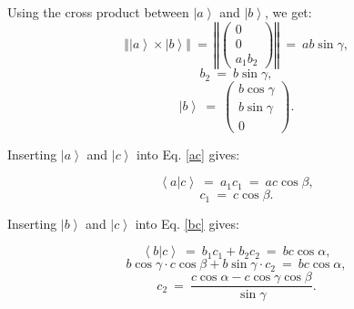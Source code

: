 Using the cross product between $\left| a \right>$ and $\left| b \right>$, we get:
\begin{equation} 
	\left\Vert \left| a \right> \times \left| b \right> \right\Vert \ =\ 
	\left\Vert \left( \begin{array}{c} 0 \\ 0 \\ a_1 b_2 \end{array} \right) \right\Vert \ =\ 
	ab \sin \gamma, \label{crossab}
\end{equation}
\begin{equation} b_2 \ =\  b \sin \gamma, \end{equation}
\begin{equation} 
\boxed{ \left| b \right> \ =\  \left( \begin{array}{c} b \cos \gamma \\ b \sin \gamma \\ 0 \end{array} \right). } 
\label{bvec} 
\end{equation}


Inserting $\left| a \right>$ and $\left| c \right>$ into Eq. \ref{ac} gives:

\begin{equation} \left< a | c \right > \ =\  a_1 c_1 \ =\  ac \cos \beta, \end{equation}
\begin{equation} c_1 \ =\  c \cos \beta. \end{equation}



Inserting $\left| b \right>$ and $\left| c \right>$ into Eq. \ref{bc} gives:

\begin{equation} \left< b | c \right > \ =\  b_1 c_1 + b_2 c_2 \ =\  bc \cos \alpha, \end{equation}
\begin{equation} b \cos \gamma \cdot c \cos \beta + b \sin \gamma \cdot c_2 \ =\  bc \cos \alpha, \end{equation}
\begin{equation} c_2 \ =\  \frac{c \cos \alpha - c \cos \gamma \cos \beta}{\sin \gamma}. \end{equation}




